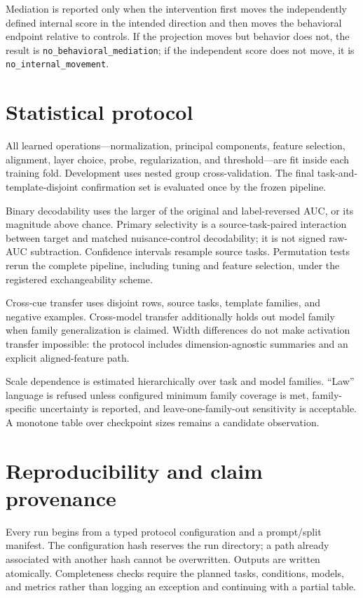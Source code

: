\documentclass[10pt]{article}
\begin{document}
Mediation is reported only when the intervention first moves the independently defined internal score in the intended direction and then moves the behavioral endpoint relative to controls. If the projection moves but behavior does not, the result is \texttt{no\_behavioral\_mediation}; if the independent score does not move, it is \texttt{no\_internal\_movement}.

\section{Statistical protocol}

All learned operations---normalization, principal components, feature selection, alignment, layer choice, probe, regularization, and threshold---are fit inside each training fold. Development uses nested group cross-validation. The final task-and-template-disjoint confirmation set is evaluated once by the frozen pipeline.

Binary decodability uses the larger of the original and label-reversed AUC, or its magnitude above chance. Primary selectivity is a source-task-paired interaction between target and matched nuisance-control decodability; it is not signed raw-AUC subtraction. Confidence intervals resample source tasks. Permutation tests rerun the complete pipeline, including tuning and feature selection, under the registered exchangeability scheme.

Cross-cue transfer uses disjoint rows, source tasks, template families, and negative examples. Cross-model transfer additionally holds out model family when family generalization is claimed. Width differences do not make activation transfer impossible: the protocol includes dimension-agnostic summaries and an explicit aligned-feature path.

Scale dependence is estimated hierarchically over task and model families. ``Law'' language is refused unless configured minimum family coverage is met, family-specific uncertainty is reported, and leave-one-family-out sensitivity is acceptable. A monotone table over checkpoint sizes remains a candidate observation.

\section{Reproducibility and claim provenance}

Every run begins from a typed protocol configuration and a prompt/split manifest. The configuration hash reserves the run directory; a path already associated with another hash cannot be overwritten. Outputs are written atomically. Completeness checks require the planned tasks, conditions, models, and metrics rather than logging an exception and continuing with a partial table.
\end{document}
